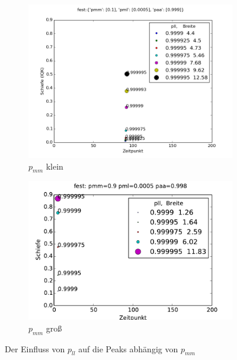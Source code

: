 \begin{figure}
\begin{subfigure}[b]{0.49\textwidth}
\includegraphics[width=\textwidth]{bilder/pll/3fest_01_00005_0999_p}
\caption{$p_{mm}$ klein}
\end{subfigure}
\begin{subfigure}[b]{0.49\textwidth}
\includegraphics[width=\textwidth]{bilder/pll/3fest_09_00005_0999_p}
\caption{$p_{mm}$ groß}
\end{subfigure}
\caption{Der Einfluss von $p_{ll}$ auf die Peaks abhängig von $p_{mm}$}
\label{einfluss_pll_pmm}
\end{figure}


